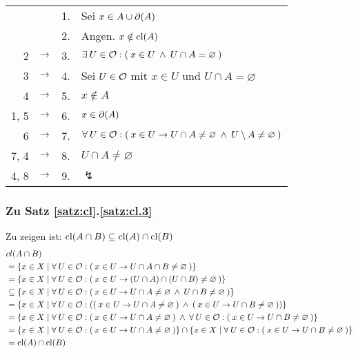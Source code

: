         \begin{longtable}{r c c l}
            & & 1. & Sei $x \in A \cup \partial(A)$ \\
            & & 2. & Angen. $x \notin \text{cl}(A)$ \\
            2 & $\rightarrow$ & 3. & $\exists\: U \in \mathcal{O} : (\: x \in U \:\land\: U \cap A = \varnothing \:)$ \\
            3 & $\rightarrow$ & 4. & Sei $U \in \mathcal{O}$ mit $x \in U$ und $U \cap A = \varnothing$ \\
            4 & $\rightarrow$ & 5. & $x \notin A$ \\
            1, 5 & $\rightarrow$ & 6. & $x \in \partial(A)$ \\
            6 & $\rightarrow$ & 7. & $\forall\: U \in \mathcal{O} : (\: x \in U \to U \cap A \neq \varnothing \:\land\: U \setminus A \neq \varnothing \:)$ \\
            7, 4 & $\rightarrow$ & 8. & $U \cap A \neq \varnothing$ \\
            4, 8 & $\rightarrow$ & 9. & $\lightning$ 
        \end{longtable}	


\subsubsection{Zu Satz \ref{satz:cl}.\ref{satz:cl.3}} 
    Zu zeigen ist: $\text{cl}(A \cap B) \subseteq \text{cl}(A) \cap \text{cl}(B)$ \\
    \begin{align*}
        &cl(A \cap B) \\
        &= \{x \in X \mid \forall\: U \in \mathcal{O} : (\: x \in U \to U \cap A \cap B \neq \varnothing \:) \}\\
        &= \{x \in X \mid \forall\: U \in \mathcal{O} : (\: x \in U \to (U \cap A) \cap (U \cap B) \neq \varnothing \:) \}\\
        &\subseteq \{x \in X \mid \forall\: U \in \mathcal{O} : (\: x \in U \to U \cap A \neq \varnothing \:\land\: U \cap B \neq \varnothing \:) \}\\
        &= \{x \in X \mid \forall\: U \in \mathcal{O} : ((\: x \in U \to U \cap A \neq \varnothing \:) \:\land\: (\: x \in U \to U \cap B \neq \varnothing \:)) \}\\
        &= \{x \in X \mid \forall\: U \in \mathcal{O} : (\: x \in U \to U \cap A \neq \varnothing \:) \:\land\: \forall\: U \in \mathcal{O} :  (\: x \in U \to U \cap B \neq \varnothing \:) \}\\
        &= \{x \in X \mid \forall\: U \in \mathcal{O} : (\: x \in U \to U \cap A \neq \varnothing \:) \} \cap \{x \in X \mid \forall\: U \in \mathcal{O} :  (\: x \in U \to U \cap B \neq \varnothing \:) \}\\
        &= \text{cl}(A) \cap \text{cl}(B)
    \end{align*}


